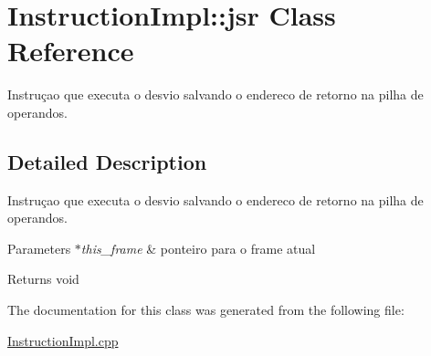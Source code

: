 \hypertarget{class_instruction_impl_1_1jsr}{}\section{Instruction\+Impl\+:\+:jsr Class Reference}
\label{class_instruction_impl_1_1jsr}


Instruçao que executa o desvio salvando o endereco de retorno na pilha de operandos.  




\subsection{Detailed Description}
Instruçao que executa o desvio salvando o endereco de retorno na pilha de operandos. 


\begin{DoxyParams}{Parameters}
{\em $\ast$this\+\_\+frame} & ponteiro para o frame atual \\
\hline
\end{DoxyParams}
\begin{DoxyReturn}{Returns}
void 
\end{DoxyReturn}


The documentation for this class was generated from the following file\+:\begin{DoxyCompactItemize}
\item 
\hyperlink{_instruction_impl_8cpp}{Instruction\+Impl.\+cpp}\end{DoxyCompactItemize}
